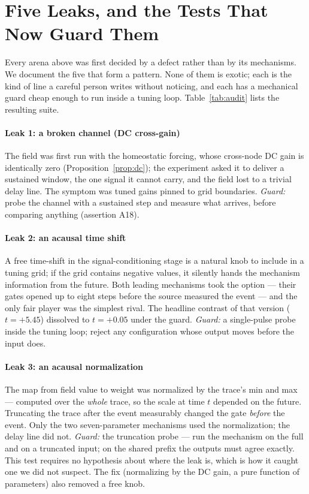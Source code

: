 \documentclass[journal]{IEEEtran}
\theoremstyle{definition}
\begin{document}
\section{Five Leaks, and the Tests That Now Guard Them}
\label{sec:methodology}
Every arena above was first decided by a defect rather than by its
mechanisms. We document the five that form a pattern. None of them is exotic;
each is the kind of line a careful person writes without noticing, and each
has a mechanical guard cheap enough to run inside a tuning loop. Table~\ref{tab:audit} lists the
resulting suite.

\paragraph{Leak 1: a broken channel (DC cross-gain)}
The field was first run with the homeostatic forcing, whose cross-node DC gain
is identically zero (Proposition~\ref{prop:dc}); the experiment asked it to
deliver a sustained window, the one signal it cannot carry, and the field lost
to a trivial delay line. The symptom was tuned gains pinned to grid
boundaries. \emph{Guard:} probe the channel with a sustained step and measure
what arrives, before comparing anything (assertion A18).

\paragraph{Leak 2: an acausal time shift}
A free time-shift in the signal-conditioning stage is a natural knob to
include in a tuning grid; if the grid contains negative values, it silently
hands the mechanism information from the future. Both leading mechanisms took
the option --- their gates opened up to eight steps before the source measured
the event --- and the only fair player was the simplest rival. The headline
contrast of that version ($t=+5.45$) dissolved to $t=+0.05$ under the guard.
\emph{Guard:} a single-pulse probe inside the tuning loop; reject any
configuration whose output moves before the input does.

\paragraph{Leak 3: an acausal normalization}
The map from field value to weight was normalized by the trace's min and max
--- computed over the \emph{whole} trace, so the scale at time $t$ depended on
the future. Truncating the trace after the event measurably changed the gate
\emph{before} the event. Only the two seven-parameter mechanisms
used the normalization; the delay line did not. \emph{Guard:} the truncation
probe --- run the mechanism on the full and on a truncated input; on the
shared prefix the outputs must agree exactly. This test requires no hypothesis
about where the leak is, which is how it caught one we did not suspect. The
fix (normalizing by the DC gain, a pure function of parameters) also removed a
free knob.
\end{document}
